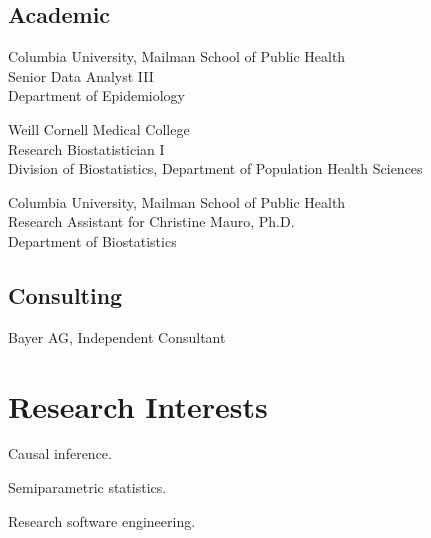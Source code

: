 \documentclass[12pt,letterpaper]{report}
\newcommand{\listitemspace}{0.15em}
\renewenvironment{itemize}
{\begin{list}{}{\setlength{\leftmargin}{0em}
            \setlength{\parskip}{0em}
            \setlength{\itemsep}{\listitemspace}
            \setlength{\parsep}{\listitemspace}}}
    {\end{list}}
\begin{document}
    \subsection*{Academic}

    \begin{tablist}
    
    	\item[2021-] \tab Columbia University, Mailman School of Public Health \\
						  Senior Data Analyst III \\
						  Department of Epidemiology

        \item[2019-21] \tab Weill Cornell Medical College \\
                            Research Biostatistician I  \\
                            Division of Biostatistics, Department of Population Health Sciences 
        
        \item[2018]  \tab Columbia University, Mailman School of Public Health \\
                          Research Assistant for Christine Mauro, Ph.D. \\
                          Department of Biostatistics

    \end{tablist}
    
    \subsection*{Consulting}
    
    \begin{tablist}
						  
	\item[2021] \tab Bayer AG, Independent Consultant
    
    \end{tablist}

    \section*{Research Interests}

    \begin{itemize}
    
    	\item Causal inference.

        \item Semiparametric statistics.

        \item Research software engineering.

    \end{itemize}
\end{document}
